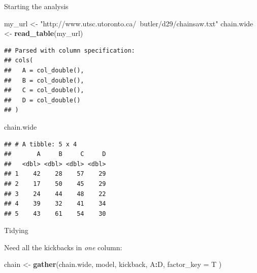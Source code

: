 \documentclass[ignorenonframetext,]{beamer}
\newenvironment{Shaded}{\begin{snugshade}}{\end{snugshade}}
\newcommand{\DataTypeTok}[1]{\textcolor[rgb]{0.13,0.29,0.53}{#1}}
\newcommand{\KeywordTok}[1]{\textcolor[rgb]{0.13,0.29,0.53}{\textbf{#1}}}
\newcommand{\NormalTok}[1]{#1}
\newcommand{\OperatorTok}[1]{\textcolor[rgb]{0.81,0.36,0.00}{\textbf{#1}}}
\newcommand{\StringTok}[1]{\textcolor[rgb]{0.31,0.60,0.02}{#1}}
\begin{document}
\begin{frame}[fragile]{Starting the analysis}
\protect\hypertarget{starting-the-analysis}{}

\begin{Shaded}
\begin{Highlighting}[]
\NormalTok{my_url <-}\StringTok{ "http://www.utsc.utoronto.ca/~butler/d29/chainsaw.txt"}
\NormalTok{chain.wide <-}\StringTok{ }\KeywordTok{read_table}\NormalTok{(my_url)}
\end{Highlighting}
\end{Shaded}

\begin{verbatim}
## Parsed with column specification:
## cols(
##   A = col_double(),
##   B = col_double(),
##   C = col_double(),
##   D = col_double()
## )
\end{verbatim}

\begin{Shaded}
\begin{Highlighting}[]
\NormalTok{chain.wide}
\end{Highlighting}
\end{Shaded}

\begin{verbatim}
## # A tibble: 5 x 4
##       A     B     C     D
##   <dbl> <dbl> <dbl> <dbl>
## 1    42    28    57    29
## 2    17    50    45    29
## 3    24    44    48    22
## 4    39    32    41    34
## 5    43    61    54    30
\end{verbatim}

\end{frame}

\begin{frame}[fragile]{Tidying}
\protect\hypertarget{tidying}{}

Need all the kickbacks in \emph{one} column:

\begin{Shaded}
\begin{Highlighting}[]
\NormalTok{chain <-}\StringTok{ }\KeywordTok{gather}\NormalTok{(chain.wide, model, kickback, A}\OperatorTok{:}\NormalTok{D,}
  \DataTypeTok{factor_key =}\NormalTok{ T}
\NormalTok{)}
\end{Highlighting}
\end{Shaded}

\end{frame}
\end{document}
